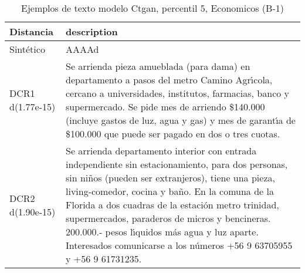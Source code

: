 \begin{table}[H]
\centering
\fontsize{10}{14}\selectfont
\caption{Ejemplos de texto modelo Ctgan, percentil 5, Economicos (B-1)}
\label{table-example-economicos-b-1-ctgan-5p-text}
\begin{tabular}{|l|m{35em}|}
\hline
\rowcolor[gray]{0.8}
Distancia & description \\
\hline Sintético & AAAAd \\
\hline DCR1 d(1.77e-15) & Se arrienda pieza amueblada (para dama) en departamento a pasos del metro Camino Agr{\'\i}cola, cercano a universidades, institutos, farmacias, banco y supermercado.
Se pide mes de arriendo \$140.000 (incluye gastos de luz, agua y gas) y mes de garant{\'\i}a de \$100.000 que puede ser pagado en dos o tres cuotas. \\
\hline DCR2 d(1.90e-15) & Se arrienda departamento interior con entrada independiente sin estacionamiento, para dos personas, sin ni\~nos (pueden ser extranjeros), tiene una pieza, living-comedor, cocina y ba\~no. En la comuna de la Florida a dos cuadras de la estaci\'on metro trinidad, supermercados, paraderos de micros y bencineras.  200.000.- pesos l{\'\i}quidos m\'as agua y luz aparte. Interesados comunicarse a los n\'umeros +56 9 63705955 y +56 9 61731235. \\
\hline
\end{tabular}
\end{table}
